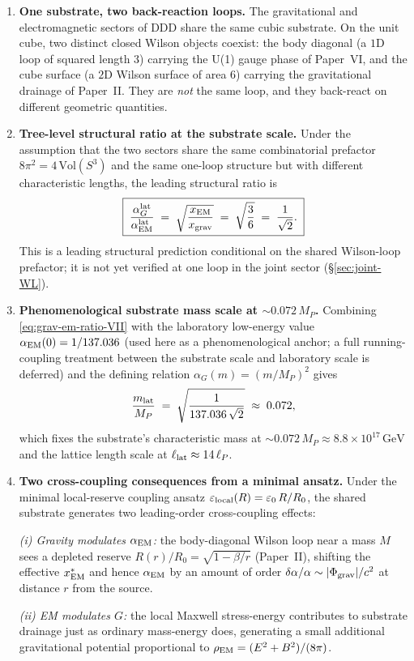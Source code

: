 \documentclass[11pt,a4paper]{article}
\begin{document}
\begin{enumerate}
\item \textbf{One substrate, two back-reaction loops.}
The gravitational and electromagnetic sectors of DDD share the
same cubic substrate. On the unit cube, two distinct closed
Wilson objects coexist: the body diagonal (a $1$D loop of
squared length $3$) carrying the U(1) gauge phase of Paper~VI,
and the cube surface (a $2$D Wilson surface of area $6$)
carrying the gravitational drainage of Paper~II. They are
\emph{not} the same loop, and they back-react on different
geometric quantities.

\item \textbf{Tree-level structural ratio at the substrate
scale.}
Under the assumption that the two sectors share the same
combinatorial prefactor $8\pi^2 = 4\,\mathrm{Vol}(S^3)$ and the
same one-loop structure but with different characteristic
lengths, the leading structural ratio is
\begin{equation}
\boxed{\;
\frac{\alpha_G^{\rm lat}}{\alpha_{\rm EM}^{\rm lat}}
\;=\; \sqrt{\frac{x_{\rm EM}}{x_{\rm grav}}}
\;=\; \sqrt{\frac{3}{6}}
\;=\; \frac{1}{\sqrt{2}}.
\;}
\label{eq:grav-em-ratio-VII}
\end{equation}
This is a leading structural prediction conditional on the
shared Wilson-loop prefactor; it is not yet verified at one loop
in the joint sector (\S\ref{sec:joint-WL}).

\item \textbf{Phenomenological substrate mass scale at $\sim
0.072\,M_P$.}
Combining \eqref{eq:grav-em-ratio-VII} with the
laboratory low-energy value $\alpha_{\rm EM}(0) = 1/137.036$
(used here as a phenomenological anchor; a full running-coupling
treatment between the substrate scale and laboratory scale is
deferred) and the defining relation $\alpha_G(m) = (m/M_P)^2$
gives
\begin{equation}
\frac{m_{\rm lat}}{M_P} \;=\; \sqrt{\frac{1}{137.036\,\sqrt{2}}}
\;\approx\; 0.072,
\end{equation}
which fixes the substrate's characteristic mass at $\sim
0.072\,M_P \approx 8.8 \times 10^{17}\,\text{GeV}$ and the
lattice length scale at $\ell_{\rm lat} \approx 14\,\ell_P$.

\item \textbf{Two cross-coupling consequences from a minimal
ansatz.}
Under the minimal local-reserve coupling ansatz
$\varepsilon_{\rm local}(R) = \varepsilon_0\,R/R_0$, the shared
substrate generates two leading-order cross-coupling effects:

\textit{(i) Gravity modulates $\alpha_{\rm EM}$:} the body-diagonal
Wilson loop near a mass $M$ sees a depleted reserve $R(r)/R_0
= \sqrt{1 - \beta/r}$ (Paper~II), shifting the effective
$x_{\rm EM}^*$ and hence $\alpha_{\rm EM}$ by an amount of
order $\delta\alpha/\alpha \sim |\Phi_{\rm grav}|/c^2$ at
distance $r$ from the source.

\textit{(ii) EM modulates $G$:} the local Maxwell stress-energy
contributes to substrate drainage just as ordinary mass-energy
does, generating a small additional gravitational potential
proportional to $\rho_{\rm EM} = (E^2 + B^2)/(8\pi)$.
\end{enumerate}
\end{document}
